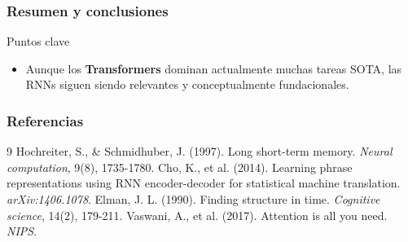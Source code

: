 \documentclass[handout]{beamer}
\begin{document}
\begin{frame}
    \frametitle{Resumen y conclusiones}
    \begin{block}{Puntos clave}
        \begin{itemize}
            \item Aunque los \textbf{Transformers} dominan actualmente muchas tareas SOTA, las RNNs siguen siendo relevantes y conceptualmente fundacionales.
        \end{itemize}
    \end{block}
\end{frame}

\begin{frame}[allowframebreaks]
 \frametitle{Referencias}
 
 \begin{thebibliography}{9}
      Hochreiter, S., \& Schmidhuber, J. (1997). Long short-term memory. \textit{Neural computation}, 9(8), 1735-1780.
      Cho, K., et al. (2014). Learning phrase representations using RNN encoder-decoder for statistical machine translation. \textit{arXiv:1406.1078}.
      Elman, J. L. (1990). Finding structure in time. \textit{Cognitive science}, 14(2), 179-211.
      Vaswani, A., et al. (2017). Attention is all you need. \textit{NIPS}.
\end{thebibliography}
\end{frame}
\end{document}
